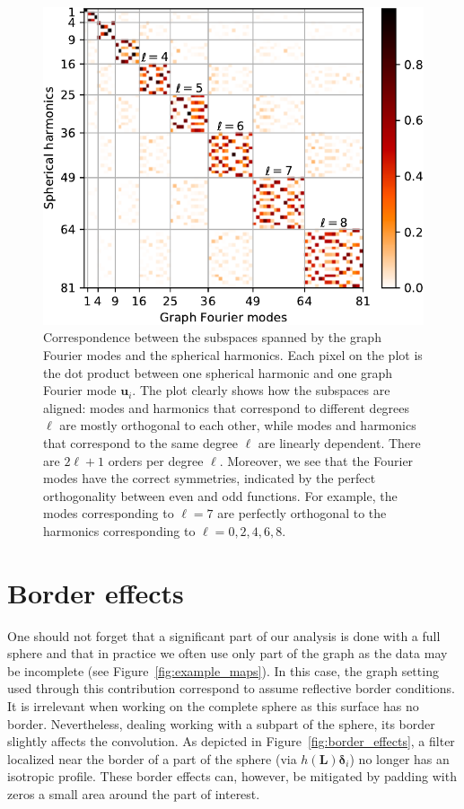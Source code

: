 \documentclass[final,twocolumn,3p,times,sort&compress]{elsarticle}
\newcommand{\figref}[1]{Figure~\ref{fig:#1}}
\renewcommand{\b}[1]{{\bm{#1}}}   %
\newcommand{\1}{\b{1}}              %
\newcommand{\0}{\b{0}}              %
\renewcommand{\L}{\b{L}}
\begin{document}
\begin{figure}
	\centering
	\includegraphics[width=\linewidth]{subspace_harmonics_eigenvectors}
	\caption{Correspondence between the subspaces spanned by the graph Fourier modes and the spherical harmonics. Each pixel on the plot is the dot product between one spherical harmonic and one graph Fourier mode $\b u_i$. The plot clearly shows how the subspaces are aligned: modes and harmonics that correspond to different degrees $\ell$ are mostly orthogonal to each other, while modes and harmonics that correspond to the same degree $\ell$ are linearly dependent. There are $2 \ell + 1$ orders per degree $\ell$. Moreover, we see that the Fourier modes have the correct symmetries, indicated by the perfect orthogonality between even and odd functions. For example, the modes corresponding to $\ell=7$ are perfectly orthogonal to the harmonics corresponding to $\ell=0,2,4,6,8$.}
	\label{fig:subspace_harmonics_eigenvectors}
\end{figure}

\section{Border effects}
\label{sec:border_effects}

One should not forget that a significant part of our analysis is done with a full sphere and that in practice we often use only part of the graph as the data may be incomplete (see \figref{example_maps}).
In this case, the graph setting used through this contribution correspond to assume reflective border conditions.
It is irrelevant when working on the complete sphere as this surface has no border. Nevertheless, dealing working with a subpart of the sphere, its border slightly affects the convolution.
As depicted in \figref{border_effects}, a filter localized near the border of a part of the sphere (via $h(\L) \b \delta_i$) no longer has an isotropic profile.
These border effects can, however, be mitigated by padding with zeros a small area around the part of interest.
\end{document}
